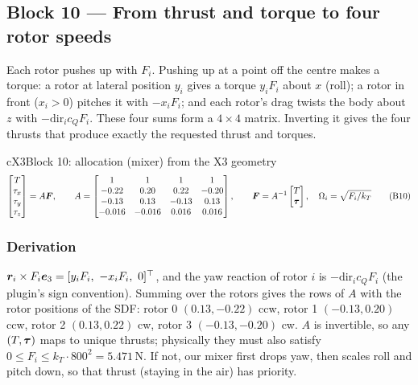 \subsection{Block 10 --- From thrust and torque to four rotor speeds}
\label{sec:b10}

\begin{idea}
Each rotor pushes up with $F_i$. Pushing up at a point off the centre makes a torque: a rotor at lateral position $y_i$
gives a torque $y_iF_i$ about $x$ (roll); a rotor in front ($x_i>0$) pitches it with $-x_iF_i$; and each rotor's drag twists the body
about $z$ with $-\mathrm{dir}_ic_QF_i$. These four sums form a $4\times4$ matrix. Inverting it gives the four thrusts that
produce exactly the requested thrust and torques.
\end{idea}

\begin{eqbox}{cX3}{Block 10: allocation (mixer) from the X3 geometry}
\begin{equation}
\begin{bmatrix}T\\\tau_x\\\tau_y\\\tau_z\end{bmatrix}=A\bm{F},\qquad
A=\begin{bmatrix}1&1&1&1\\-0.22&0.20&0.22&-0.20\\-0.13&0.13&-0.13&0.13\\-0.016&-0.016&0.016&0.016\end{bmatrix},\qquad
\bm{F}=A^{-1}\begin{bmatrix}T\\\bm{\tau}\end{bmatrix},\quad \Omega_i=\sqrt{F_i/k_T} \tag{B10}\label{eq:mixer}
\end{equation}
\end{eqbox}

\subsubsection*{Derivation}
$\vr_i\times F_i\bm e_3=[y_iF_i,\ -x_iF_i,\ 0]^\top$, and the yaw reaction of rotor $i$ is $-\mathrm{dir}_ic_QF_i$ (the
plugin's sign convention). Summing over the rotors gives the rows of $A$ with the rotor positions of the SDF:
rotor 0 $(0.13,-0.22)$ ccw, rotor 1 $(-0.13,0.20)$ ccw, rotor 2 $(0.13,0.22)$ cw, rotor 3 $(-0.13,-0.20)$ cw. $A$ is
invertible, so any $(T,\bm{\tau})$ maps to unique thrusts; physically they must also satisfy $0\le F_i\le k_T\cdot800^2=5.471$\,N.
If not, our mixer first drops yaw, then scales roll and pitch down, so that thrust (staying in the air) has priority.

